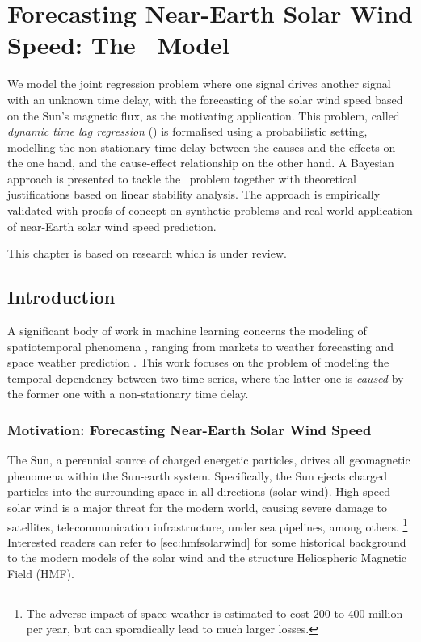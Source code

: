 \chapter{Forecasting Near-Earth Solar Wind Speed: The \XX \ Model}\label{chapter:pdt}

{\small
  We model the joint regression problem where one signal drives another signal with an unknown 
  time delay, with the forecasting of the solar wind speed based on the Sun's magnetic flux, as the 
  motivating application. This problem, called \emph{dynamic time lag regression} (\XX) is 
  formalised using a probabilistic setting, modelling the non-stationary time delay between the 
  causes and the effects on the one hand, and the cause-effect relationship on the other hand. A 
  Bayesian approach is presented to tackle the \XX\ problem together with theoretical 
  justifications based on linear stability analysis. The approach is empirically validated with 
  proofs of concept on synthetic problems and real-world application of near-Earth solar wind speed 
  prediction. 
}


\vfill
{}
\vfill

\noindent
    \parbox{\textwidth}{%
        {\small This chapter is based on research which is under review.}
    }%


\clearpage


\section{Introduction}\label{sec:intro}
A significant body of work in machine learning concerns the modeling of spatiotemporal phenomena 
\citep{SurveyST,NIPSForecasting18}, ranging from markets \citep{Pedreschi} to weather forecasting 
\citep{Horvitz} and space weather prediction \citep{EnricoLorentz,camporeale2018machine,EnricoArxiv}. 
This work focuses on the problem of modeling the temporal dependency between two time series, where 
the latter one is {\em caused} by the former one \citep{Granger} with a non-stationary time delay. 


\subsection{Motivation: Forecasting Near-Earth Solar Wind Speed}\label{sec:motivationsolarwind}
The Sun, a perennial source of charged energetic particles, drives all geomagnetic phenomena within 
the Sun-earth system. Specifically, the Sun ejects charged particles into the surrounding space in 
all directions (solar wind). High speed solar wind is a major threat for the modern world, causing 
severe damage to satellites, telecommunication infrastructure, under sea pipelines, among others. 
\footnote{The adverse impact of space weather is estimated to cost $200$ to $400$ million per year, 
but can sporadically lead to much larger losses.} Interested readers can refer to 
\cref{sec:hmfsolarwind} for some historical background to the modern models of the solar wind and 
the structure Heliospheric Magnetic Field (HMF). 

